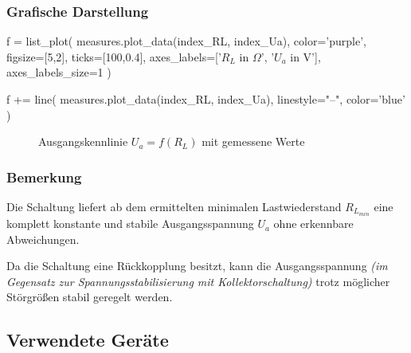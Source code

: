 \documentclass[a4paper]{hitec}
\begin{document}
\subsubsection{Grafische Darstellung}

\begin{sagesilent}
    f = list_plot(
        measures.plot_data(index_RL, index_Ua),
        color='purple',
        figsize=[5,2],
        ticks=[100,0.4],
        axes_labels=['$R_L$ in $\Omega$', '$U_a$ in V'],
        axes_labels_size=1
    )

    f += line(
        measures.plot_data(index_RL, index_Ua),
        linestyle="--",
        color='blue'
    )
\end{sagesilent}

\begin{figure}[H]
    \centering
    \caption{Ausgangskennlinie \textbf{$U_{a} = f(R_L)$} mit gemessene Werte}
    \label{fig:measure2}
\end{figure}

\subsubsection{Bemerkung}

Die Schaltung liefert ab dem ermittelten minimalen Lastwiederstand $R_{L_{min}}$ eine komplett konstante und stabile Ausgangsspannung $U_{a}$ ohne erkennbare Abweichungen.

Da die Schaltung eine Rückkopplung besitzt, kann die Ausgangsspannung \textit{(im Gegensatz zur Spannungsstabilisierung mit Kollektorschaltung)} trotz möglicher Störgrößen stabil geregelt werden.

\subsection{Verwendete Geräte}

\begin{devicelist}
\end{devicelist}

\clearpage

\IncludeHistoryTimeline

\clearpage




\end{document}
